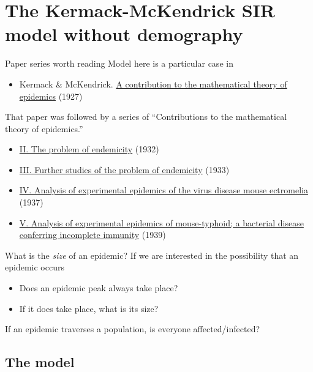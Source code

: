 \documentclass[aspectratio=169]{beamer}\usepackage[]{graphicx}\usepackage[]{xcolor}
\begin{document}
\section{The Kermack-McKendrick SIR model without demography}


\begin{frame}{Paper series worth reading}
Model here is a particular case in
\begin{itemize}
  \item Kermack \& McKendrick. \href{https://doi.org/10.1098/rspa.1927.0118}{A contribution to the mathematical theory of epidemics} (1927)
\end{itemize}
\vfill
That paper was followed by a series of ``Contributions to the mathematical theory of epidemics.''
\begin{itemize}
  \item \href{https://doi.org/10.1098/rspa.1932.0171}{II. The problem of endemicity} (1932)
  \item \href{https://doi.org/10.1098/rspa.1933.0106}{III. Further studies of the problem of endemicity} (1933)
  \item \href{https://doi.org/10.1017/S0022172400034902}{IV. Analysis of experimental epidemics of the virus disease mouse ectromelia} (1937)
  \item \href{https://doi.org/10.1017/S0022172400011918}{V. Analysis of experimental epidemics of mouse-typhoid; a bacterial disease conferring incomplete immunity} (1939)
\end{itemize}
\end{frame}

\begin{frame}{What is the \emph{size} of an epidemic?}
\bbullet 
If we are interested in the possibility that an epidemic occurs
\begin{itemize}
  \item Does an epidemic peak always take place?
  \item If it does take place, what is its size?
\end{itemize}
\vfill
\bbullet If an epidemic traverses a population, is everyone affected/infected?
\end{frame}


\subsection{The model}
\end{document}
